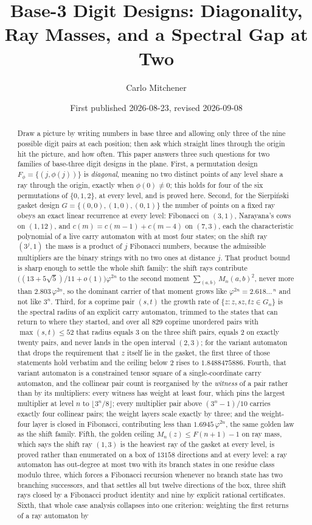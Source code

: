 \documentclass[11pt]{amsart}
\title[Base-3 Digit Designs]{Base-3 Digit Designs: Diagonality, Ray Masses, and a Spectral Gap at Two}
\author{Carlo Mitchener}
\date{First published 2026-08-23, revised 2026-09-08}
\theoremstyle{definition}
\theoremstyle{remark}
\begin{document}
\begin{abstract}
Draw a picture by writing numbers in base three and allowing only three of the nine possible digit pairs at each position; then ask which straight lines through the origin hit the picture, and how often. This paper answers three such questions for two families of base-three digit designs in the plane. First, a permutation design $F_\phi=\{(j,\phi(j))\}$ is \emph{diagonal}, meaning no two distinct points of any level share a ray through the origin, exactly when $\phi(0)\neq 0$; this holds for four of the six permutations of $\{0,1,2\}$, at every level, and is proved here. Second, for the Sierpi\'nski gasket design $G=\{(0,0),(1,0),(0,1)\}$ the number of points on a fixed ray obeys an exact linear recurrence at every level: Fibonacci on $(3,1)$, Narayana's cows on $(1,12)$, and $c(m)=c(m-1)+c(m-4)$ on $(7,3)$, each the characteristic polynomial of a live carry automaton with at most four states; on the shift ray $(3^j,1)$ the mass is a product of $j$ Fibonacci numbers, because the admissible multipliers are the binary strings with no two ones at distance $j$. That product bound is sharp enough to settle the whole shift family: the shift rays contribute $\bigl((13+5\sqrt5)/11+o(1)\bigr)\varphi^{2n}$ to the second moment $\sum_{(a,b)}M_n(a,b)^2$, never more than $2.803\,\varphi^{2n}$, so the dominant carrier of that moment grows like $\varphi^{2n}=2.618\ldots^{\,n}$ and not like $3^n$. Third, for a coprime pair $(s,t)$ the growth rate of $\{z: z, sz, tz \in G_n\}$ is the spectral radius of an explicit carry automaton, trimmed to the states that can return to where they started, and over all $829$ coprime unordered pairs with $\max(s,t)\le 52$ that radius equals $3$ on the three shift pairs, equals $2$ on exactly twenty pairs, and never lands in the open interval $(2,3)$; for the variant automaton that drops the requirement that $z$ itself lie in the gasket, the first three of those statements hold verbatim and the ceiling below $2$ rises to $1.8488475886$. Fourth, that variant automaton is a constrained tensor square of a single-coordinate carry automaton, and the collinear pair count is reorganised by the \emph{witness} of a pair rather than by its multipliers: every witness has weight at least four, which pins the largest multiplier at level $n$ to $\lfloor 3^n/8\rfloor$; every multiplier pair above $(3^n-1)/10$ carries exactly four collinear pairs; the weight layers scale exactly by three; and the weight-four layer is closed in Fibonacci, contributing less than $1.6945\,\varphi^{2n}$, the same golden law as the shift family. Fifth, the golden ceiling $M_n(z)\le F(n+1)-1$ on ray mass, which says the shift ray $(1,3)$ is the heaviest ray of the gasket at every level, is proved rather than enumerated on a box of $13158$ directions and at every level: a ray automaton has out-degree at most two with its branch states in one residue class modulo three, which forces a Fibonacci recursion whenever no branch state has two branching successors, and that settles all but twelve directions of the box, three shift rays closed by a Fibonacci product identity and nine by explicit rational certificates. Sixth, that whole case analysis collapses into one criterion: weighting the first returns of a ray automaton by 
\end{abstract}
\end{document}
